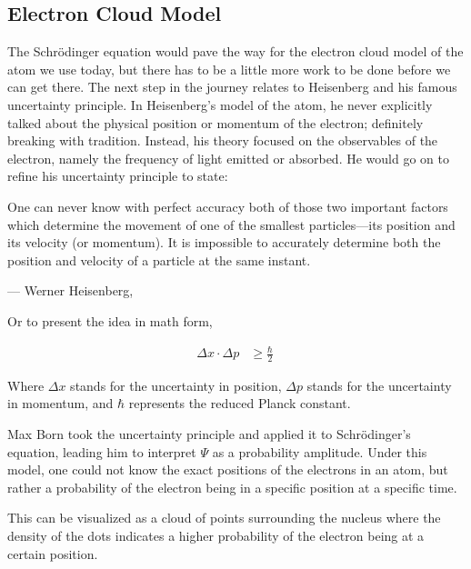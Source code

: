 \subsection{Electron Cloud Model}

The Schrödinger equation would pave the way for the electron cloud model of the atom we use today, but there has to be a little more work to be done before we can get there.
The next step in the journey relates to Heisenberg and his famous uncertainty principle.
In Heisenberg's model of the atom, he never explicitly talked about the physical position or momentum of the electron; definitely breaking with tradition. Instead, his theory focused on the observables of the electron, namely the frequency of light emitted or absorbed. He would go on to refine his uncertainty principle to state:

One can never know with perfect accuracy both of those two important factors which determine the movement of one of the smallest particles—its position and its velocity (or momentum). It is impossible to accurately determine both the position and velocity of a particle at the same instant.

\begin{flushright}--- Werner Heisenberg,\end{flushright}

Or to present the idea in math form,

\begin{align}
  \Delta x \cdot \Delta p &\geq \frac{\hbar}{2} \
\end{align}

Where $\Delta x$ stands for the uncertainty in position, $\Delta p$ stands for the uncertainty in momentum, and $\hbar$ represents the reduced Planck constant\cite{Heisenberg_1927}.

Max Born took the uncertainty principle and applied it to Schrödinger's equation, leading him to interpret $\Psi$ as a probability amplitude. Under this model, one could not know the exact positions of the electrons in an atom, but rather a probability of the electron being in a specific position at a specific time.

This can be visualized as a cloud of points surrounding the nucleus where the density of the dots indicates a higher probability of the electron being at a certain position.

